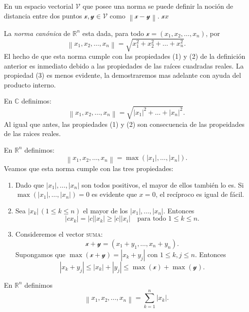\documentclass[twocolumn]{notasdeclase}
\newcommand{\ve}[1]{\mathscr{#1}}
\newcommand{\V}{\mathcal{V}}
\newcommand{\Norm}[1]{\left\lVert#1\right\rVert}
\newcommand{\dt}[2]{#1_1 #2 #1_2 #2 \dots #2 #1_n}
\newcommand{\Rn}{\mathbb{R}^n}
\begin{document}
\noindent
En un espacio vectorial $\V$ que posee una norma se puede definir la noción de distancia entre dos puntos $\ve{x,y}\in\V$ como $\Norm{\ve x-\ve y}$. $\mathscr{x}x$

\begin{ejem}
	La \emph{norma canónica} de $\Rn$ esta dada, para todo $\ve x=(\dt{x}{,})$, por
	\[ \Norm{\dt{x}{,}} = \sqrt{\dt{x^2}{+}}. \]
	El hecho de que esta norma cumple con las propiedades (1) y (2) de la definición anterior es inmediato debido a las propiedades de las raíces cuadradas reales. La propiedad (3) es menos evidente, la demostraremos mas adelante con ayuda del producto interno.
\end{ejem}

\begin{ejem}
	En $\mathbb{C}$ definimos:
	\[ \Norm{\dt{x}{,}} = \sqrt{|x_1|^2+\dots+|x_n|^2}. \]
	Al igual que antes, las propiedades (1) y (2) son consecuencia de las propeidades de las raices reales.
\end{ejem}

\begin{ejem}
	En $\Rn$ definimos:
	\[ \Norm{\dt{x}{,}} = \max(|x_1|,\dots,|x_n|). \]
	Veamos que esta norma cumple con las tres propiedades:
	\begin{enumerate}
		\item Dado que $|x_1|,\dots,|x_n|$ son todos positivos, el mayor de ellos también lo es. Si $\max(|x_1|,\dots,|x_n|) = 0$ es evidente que $x=0$, el recíproco es igual de fácil.
		\item Sea $|x_k|\,(1\leq k\leq n)$ el mayor de los $|x_1|,\dots,|x_n|$. Entonces
		\[ |cx_k| = |c||x_k| \geq |c||x_i| \quad\text{para todo $1\leq k\leq n$}. \]
		\item Consideremos el vector \textsc{suma}:
		\[ \ve x+\ve y = (x_1+y_1,\dots,x_n+y_n). \]
		Supongamos que $\max(\ve x+\ve y) = |x_k+y_j|$ con $1\leq k,j\leq n$. Entonces
		\[ |x_k+y_j|\leq|x_k|+|y_j|\leq\max(\ve x) + \max(\ve y). \]
	\end{enumerate}
\end{ejem}
\begin{ejem}
	En $\Rn$ definimos
	\[ \Norm{\dt{x}{,}} = \sum_{k=1}^{n} |x_k|. \]
\end{ejem}
\end{document}
